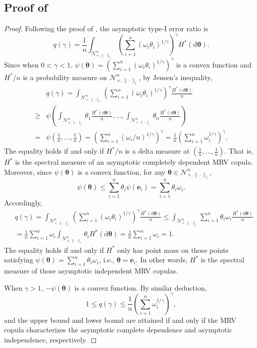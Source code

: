 \documentclass[12pt]{article}
\theoremstyle{plain}
\theoremstyle{plain}
\theoremstyle{definition}
\newcommand{\punitsphereone}[1]{\mathcal{N}_{+,\|\cdot\|_1}^{#1}}
\begin{document}
\subsection{Proof of }
\label{subsec:error-complete-dependence}
\ErrorCompleteDependence*
\begin{proof}
Following the proof of , the asymptotic type-I error ratio is
\[
q(\gamma)
=\frac{1}{n}\int_{\punitsphereone{n}}\left(\sum_{i=1}^n(\omega_i\theta_i)^{1/\gamma}\right)^\gamma H^*(\mathrm{d}\bm{\theta}).
\]
Since when $0<\gamma<1$, $\psi(\bm\theta)=\left(\sum_{i=1}^n(\omega_i\theta_i)^{1/\gamma}\right)^\gamma$ is a convex function and $H^*/n$ is a probability measure on $\punitsphereone{n}$, by Jensen's inequality,
\begin{align*}
&q(\gamma)
=\int_{\punitsphereone{n}}\left(\sum_{i=1}^n(\omega_i\theta_i)^{1/\gamma}\right)^\gamma \frac{H^*(\mathrm{d}\bm{\theta})}{n}\\
\ge& \psi\left(\int_{\punitsphereone{n}}\theta_1 \frac{H^*(\mathrm{d}\bm{\theta})}{n},\dots,\int_{\punitsphereone{n}}\theta_n \frac{H^*(\mathrm{d}\bm{\theta})}{n}\right)\\
=&\psi\left(\frac{1}{n},\dots,\frac{1}{n}\right)
=\left(\sum_{i=1}^n(\omega_i/n)^{1/\gamma}\right)^\gamma
=\frac{1}{n}\left(\sum_{i=1}^n \omega_i^{1/\gamma}\right)^\gamma.
\end{align*}
The equality holds if and only if $H^*/n$ is a delta measure at $(\frac{1}{n},\dots,\frac{1}{n})$. That is, $H^*$ is the spectral measure of an asymptotic completely dependent MRV copula. Moreover, since $\psi(\bm\theta)$ is a convex function, for any $\bm\theta\in\punitsphereone{n}$,
\[
\psi(\bm\theta)
\le\sum_{i=1}^n\theta_i\psi(\mathbf{e}_i)=\sum_{i=1}^n\theta_i\omega_i.
\]
Accordingly,
\begin{align*}
&q(\gamma)
=\int_{\punitsphereone{n}}\left(\sum_{i=1}^n(\omega_i\theta_i)^{1/\gamma}\right)^\gamma \frac{H^*(\mathrm{d}\bm{\theta})}{n}
\le \int_{\punitsphereone{n}}\sum_{i=1}^n\theta_i\omega_i \frac{H^*(\mathrm{d}\bm{\theta})}{n}\\
&=\frac{1}{n}\sum_{i=1}^n\omega_i\int_{\punitsphereone{n}}\theta_i H^*(\mathrm{d}\bm{\theta})
=\frac{1}{n}\sum_{i=1}^n\omega_i
=1.
\end{align*}
The equality holds if and only if $H^*$ only has point mass on those points satisfying $\psi(\bm\theta)=\sum_{i=1}^n\theta_i\omega_i$, i.e., $\bm\theta=\mathbf{e}_i$. In other words, $H^*$ is the spectral measure of those asymptotic independent MRV copulas.

When $\gamma>1$, $-\psi(\bm\theta)$ is a convex function. By similar deduction,
\[
1\le q(\gamma)\le\frac{1}{n}\left(\sum_{i=1}^n \omega_i^{1/\gamma}\right)^\gamma,
\]
and the upper bound and lower bound are attained if and only if the MRV copula characterizes the asymptotic complete dependence and asymptotic independence, respectively.
\end{proof}
\end{document}
